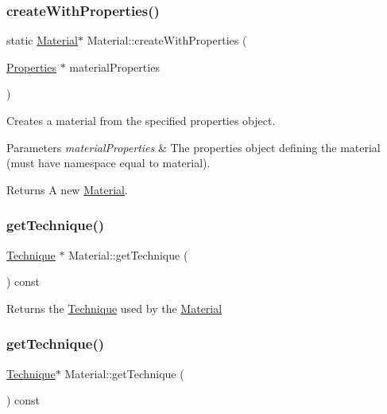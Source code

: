\subsubsection{\texorpdfstring{create\+With\+Properties()}{createWithProperties()}\hspace{0.1cm}{\footnotesize\ttfamily [2/2]}}
{\footnotesize\ttfamily static \hyperlink{classMaterial}{Material}$\ast$ Material\+::create\+With\+Properties (\begin{DoxyParamCaption}\item[{\hyperlink{classProperties}{Properties} $\ast$}]{material\+Properties }\end{DoxyParamCaption})\hspace{0.3cm}{\ttfamily [static]}}

Creates a material from the specified properties object.


\begin{DoxyParams}{Parameters}
{\em material\+Properties} & The properties object defining the material (must have namespace equal to \textquotesingle{}material\textquotesingle{}). \\
\hline
\end{DoxyParams}
\begin{DoxyReturn}{Returns}
A new \hyperlink{classMaterial}{Material}. 
\end{DoxyReturn}
\mbox{\label{classMaterial_af836a89c249c129938b2572bde8780c3}} 
\subsubsection{\texorpdfstring{get\+Technique()}{getTechnique()}\hspace{0.1cm}{\footnotesize\ttfamily [1/2]}}
{\footnotesize\ttfamily \hyperlink{classTechnique}{Technique} $\ast$ Material\+::get\+Technique (\begin{DoxyParamCaption}{ }\end{DoxyParamCaption}) const}

Returns the \hyperlink{classTechnique}{Technique} used by the \hyperlink{classMaterial}{Material} \mbox{\label{classMaterial_ab608fdd95b62c5e489715708c1107591}} 
\subsubsection{\texorpdfstring{get\+Technique()}{getTechnique()}\hspace{0.1cm}{\footnotesize\ttfamily [2/2]}}
{\footnotesize\ttfamily \hyperlink{classTechnique}{Technique}$\ast$ Material\+::get\+Technique (\begin{DoxyParamCaption}{ }\end{DoxyParamCaption}) const}

